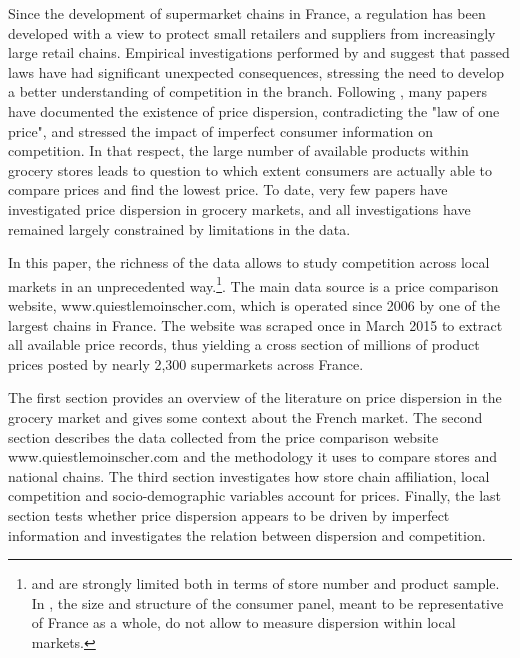 \documentclass[english]{article}
\begin{document}
Since the development of supermarket chains in France, a regulation has been developed with a view to protect small retailers and suppliers from increasingly large retail chains. Empirical investigations performed by\cite{BER02} and \cite{BIS13} suggest that passed laws have had significant unexpected consequences, stressing the need to develop a better understanding of competition in the branch. Following \cite{STI61}, many papers have documented the existence of price dispersion, contradicting the "law of one price", and stressed the impact of imperfect consumer information on competition. In that respect, the large number of available products within grocery stores leads to question to which extent consumers are actually able to compare prices and find the lowest price. To date, very few papers have investigated price dispersion in grocery markets, and all investigations have remained largely constrained by limitations in the data.

In this paper, the richness of the data allows to study competition across local markets in an unprecedented way.\footnote{\cite{LAC02} and \cite{ZHA06} are strongly limited both in terms of store number and product sample. In \cite{PER15}, the size and structure of the consumer panel, meant to be representative of France as a whole, do not allow to measure dispersion within local markets.}. The main data source is a price comparison website, www.quiestlemoinscher.com, which is operated since 2006 by one of the largest chains in France. The website was scraped once in March 2015 to extract all available price records, thus yielding a cross section of millions of product prices posted by nearly 2,300 supermarkets across France.

The first section provides an overview of the literature on price dispersion in the grocery market and gives some context about the French market. The second section describes the data collected from the price comparison website www.quiestlemoinscher.com and the methodology it uses to compare stores and national chains. The third section investigates how store chain affiliation, local competition and socio-demographic variables account for prices. Finally, the last section tests whether price dispersion appears to be driven by imperfect information and investigates the relation between dispersion and competition.
\end{document}

